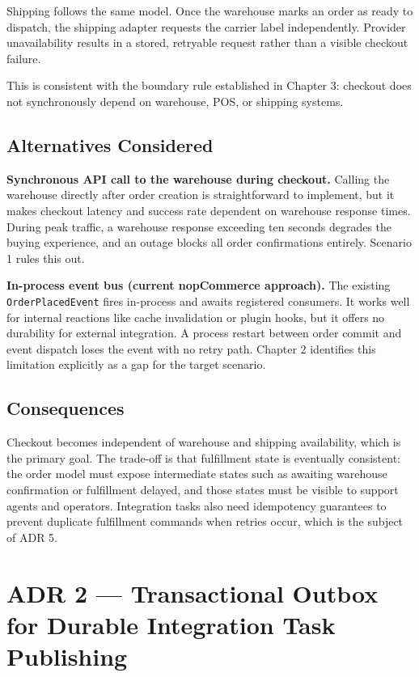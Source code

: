Shipping follows the same model. Once the warehouse marks an order as ready to dispatch, the
shipping adapter requests the carrier label independently. Provider unavailability results in a
stored, retryable request rather than a visible checkout failure.

This is consistent with the boundary rule established in Chapter 3: checkout does not
synchronously depend on warehouse, POS, or shipping systems.

\subsection{Alternatives Considered}

\textbf{Synchronous API call to the warehouse during checkout.} Calling the warehouse directly
after order creation is straightforward to implement, but it makes checkout latency and success
rate dependent on warehouse response times. During peak traffic, a warehouse response exceeding
ten seconds degrades the buying experience, and an outage blocks all order confirmations
entirely. Scenario 1 rules this out.

\textbf{In-process event bus (current nopCommerce approach).} The existing
\texttt{OrderPlacedEvent} fires in-process and awaits registered consumers. It works well for
internal reactions like cache invalidation or plugin hooks, but it offers no durability for
external integration. A process restart between order commit and event dispatch loses the event
with no retry path. Chapter 2 identifies this limitation explicitly as a gap for the target
scenario.

\subsection{Consequences}

Checkout becomes independent of warehouse and shipping availability, which is the primary goal.
The trade-off is that fulfillment state is eventually consistent: the order model must expose
intermediate states such as awaiting warehouse confirmation or fulfillment delayed, and those
states must be visible to support agents and operators. Integration tasks also need idempotency
guarantees to prevent duplicate fulfillment commands when retries occur, which is the subject
of ADR 5.

\section{ADR 2 — Transactional Outbox for Durable Integration Task Publishing}

